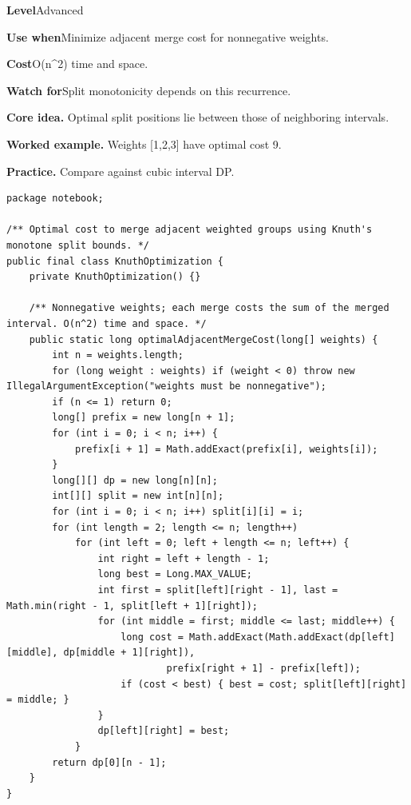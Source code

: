 \documentclass[10pt,letterpaper]{article}
\newcommand{\entrylabel}[1]{\textcolor{accent}{\bfseries #1}}
\begin{document}
\begin{guidebox}\small
\entrylabel{Level}\quad Advanced\par
\entrylabel{Use when}\quad Minimize adjacent merge cost for nonnegative weights.\par
\entrylabel{Cost}\quad O(n\textasciicircum{}2) time and space.\par
\entrylabel{Watch for}\quad Split monotonicity depends on this recurrence.\par
\end{guidebox}
\noindent\textbf{Core idea.} Optimal split positions lie between those of neighboring intervals.\par
\noindent\textbf{Worked example.} Weights [1,2,3] have optimal cost 9.\par
\noindent\textbf{Practice.} Compare against cubic interval DP.\par
\begin{lstlisting}
package notebook;

/** Optimal cost to merge adjacent weighted groups using Knuth's monotone split bounds. */
public final class KnuthOptimization {
    private KnuthOptimization() {}

    /** Nonnegative weights; each merge costs the sum of the merged interval. O(n^2) time and space. */
    public static long optimalAdjacentMergeCost(long[] weights) {
        int n = weights.length;
        for (long weight : weights) if (weight < 0) throw new IllegalArgumentException("weights must be nonnegative");
        if (n <= 1) return 0;
        long[] prefix = new long[n + 1];
        for (int i = 0; i < n; i++) {
            prefix[i + 1] = Math.addExact(prefix[i], weights[i]);
        }
        long[][] dp = new long[n][n];
        int[][] split = new int[n][n];
        for (int i = 0; i < n; i++) split[i][i] = i;
        for (int length = 2; length <= n; length++)
            for (int left = 0; left + length <= n; left++) {
                int right = left + length - 1;
                long best = Long.MAX_VALUE;
                int first = split[left][right - 1], last = Math.min(right - 1, split[left + 1][right]);
                for (int middle = first; middle <= last; middle++) {
                    long cost = Math.addExact(Math.addExact(dp[left][middle], dp[middle + 1][right]),
                            prefix[right + 1] - prefix[left]);
                    if (cost < best) { best = cost; split[left][right] = middle; }
                }
                dp[left][right] = best;
            }
        return dp[0][n - 1];
    }
}
\end{lstlisting}
\end{document}

